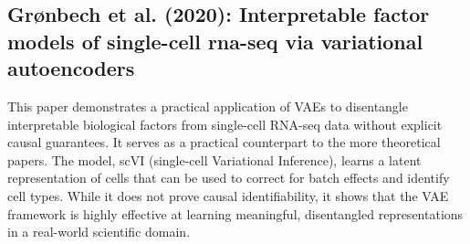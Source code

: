 \documentclass{article}
\begin{document}
\subsection{Grønbech et al. (2020): Interpretable factor models of single-cell rna-seq via variational autoencoders}
This paper demonstrates a practical application of VAEs to disentangle interpretable biological factors from single-cell RNA-seq data without explicit causal guarantees. It serves as a practical counterpart to the more theoretical papers. The model, scVI (single-cell Variational Inference), learns a latent representation of cells that can be used to correct for batch effects and identify cell types. While it does not prove causal identifiability, it shows that the VAE framework is highly effective at learning meaningful, disentangled representations in a real-world scientific domain.
\end{document}

